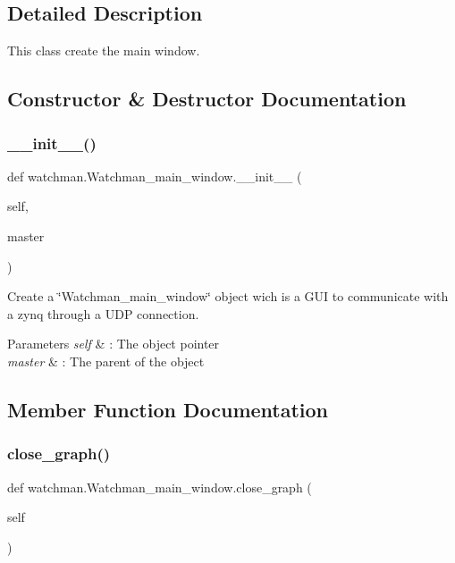 \subsection{Detailed Description}
This class create the main window. 

\subsection{Constructor \& Destructor Documentation}
\mbox{\label{classwatchman_1_1_watchman__main__window_a4f1913d70284dd2b3d17e17a76d64bd8}} 
\subsubsection{\_\_init\_\_()}
{\footnotesize\ttfamily def watchman.\+Watchman\+\_\+main\+\_\+window.\+\_\+\+\_\+init\+\_\+\+\_\+ (\begin{DoxyParamCaption}\item[{}]{self,  }\item[{}]{master }\end{DoxyParamCaption})}



Create a \char`\"{}\+Watchman\+\_\+main\+\_\+window\char`\"{} object wich is a G\+UI to communicate with a zynq through a U\+DP connection. 


\begin{DoxyParams}{Parameters}
{\em self} & \+: The object pointer \\
\hline
{\em master} & \+: The parent of the object \\
\hline
\end{DoxyParams}


\subsection{Member Function Documentation}
\mbox{\label{classwatchman_1_1_watchman__main__window_a7e01631a60bb1132b837329deb96ca73}} 
\subsubsection{close\_graph()}
{\footnotesize\ttfamily def watchman.\+Watchman\+\_\+main\+\_\+window.\+close\+\_\+graph (\begin{DoxyParamCaption}\item[{}]{self }\end{DoxyParamCaption})}



